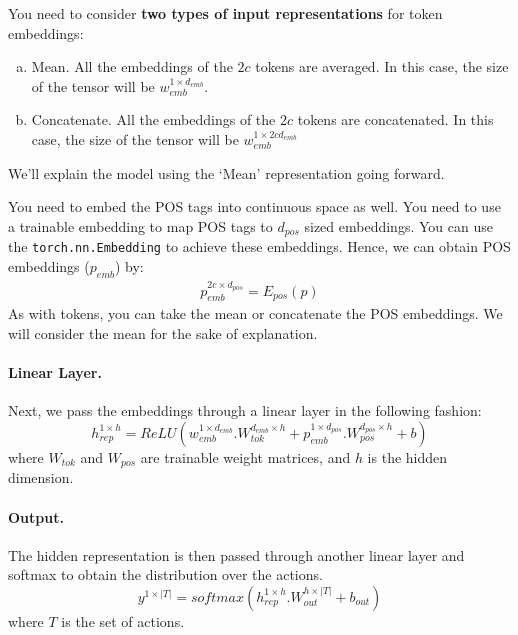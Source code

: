 You need to consider \textbf{two types of input representations} for token embeddings: 
\begin{enumerate}[(a)]
    \item Mean. All the embeddings of the $2c$ tokens are averaged. In this case, the size of the tensor will be $w_{emb}^{1\times d_{emb}}$. 
    \item Concatenate. All the embeddings of the $2c$ tokens are concatenated. In this case, the size of the tensor will  be $w_{emb}^{1\times 2cd_{emb}}$ 
\end{enumerate}

We'll explain the model using the `Mean' representation going forward. \newline


You need to embed the POS tags into continuous space as well. You need to use a trainable embedding to map POS tags to $d_{pos}$ sized embeddings. You can use the \texttt{torch.nn.Embedding} to achieve these embeddings. Hence, we can obtain POS embeddings ($p_{emb}$) by: 
\begin{align*}
    p_{emb}^{2c \times d_{pos}} = E_{pos}(p)
\end{align*}
As with tokens, you can take the mean or concatenate the POS embeddings. We will consider the mean for the sake of explanation.


\paragraph{Linear Layer.}
Next, we pass the embeddings through a linear layer in the following fashion:
\begin{equation}
    h_{rep}^{1\times h} = ReLU(w_{emb}^{1\times d_{emb}}.W_{tok}^{d_{emb}\times h} + p_{emb}^{1\times d_{pos}}.W_{pos}^{d_{pos}\times h} + b )
    \label{eq:hid}
\end{equation}
where $W_{tok}$ and $W_{pos}$ are trainable weight matrices, and $h$ is the hidden dimension.

\paragraph{Output.}
The hidden representation is then passed through another linear layer and softmax to obtain the distribution over the actions. 
\begin{equation}
    y^{1\times |T|} = softmax(h_{rep}^{1\times h}.W_{out}^{h\times |T|} + b_{out} )
\end{equation}
where $T$ is the set of actions. 



